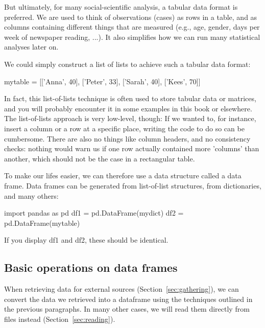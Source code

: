 But ultimately, for many social-scientific analysis, a tabular data format is preferred. We are used to think of observations (cases) as rows in a table, and as columns containing different things that are measured (e.g., age, gender, days per week of newspaper reading, ...). It also simplifies how we can run many statistical analyses later on.

We could simply construct a list of lists to achieve such a tabular data format:

\begin{examplepy}
mytable = [['Anna', 40],
           ['Peter', 33],
           ['Sarah', 40],
           ['Kees', 70]]
\end{examplepy}

In fact, this list-of-lists technique is often used to store tabular data or matrices, and you will probably encounter it in some examples in this book or elsewhere. The list-of-lists approach is very low-level, though: If we wanted to, for instance, insert a column or a row at a specific place, writing the code to do so can be cumbersome. There are also no things like column headers, and no consistency checks: nothing would warn us if one row actually contained more 'columns' than another, which should not be the case in a rectangular table.

To make our lifes easier, we can therefore use a data structure called a data frame. 
Data frames can be generated from list-of-list structures, from dictionaries, and many others:

\begin{examplepy}
import pandas as pd
df1 = pd.DataFrame(mydict)
df2 = pd.DataFrame(mytable)
\end{examplepy}

If you display df1 and df2, these should be identical.




\subsection{Basic operations on data frames}

When retrieving data for external sources (Section~\ref{sec:gathering}), we can convert the data we retrieved into a dataframe using the techniques outlined in the previous paragraphs. In many other cases, we will read them directly from files instead (Section~\ref{sec:reading}).

